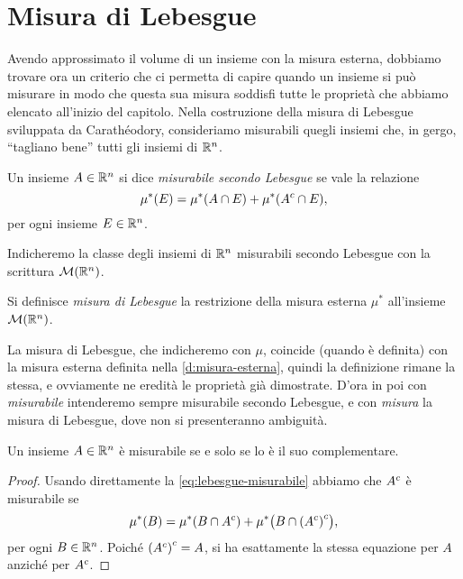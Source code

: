 \section{Misura di Lebesgue}
\label{sec:misura-lebesgue}
Avendo approssimato il volume di un insieme con la misura esterna, dobbiamo trovare ora un criterio che ci permetta di capire quando un insieme si può misurare in modo che questa sua misura soddisfi tutte le proprietà che abbiamo elencato all'inizio del capitolo.
Nella costruzione della misura di Lebesgue sviluppata da Carath\'eodory, consideriamo misurabili quegli insiemi che, in gergo, ``tagliano bene'' tutti gli insiemi di $\mathbb{R}^n$.
\begin{definizione} \label{d:lebesgue-misurabile}
	Un insieme $A\in\mathbb{R}^n$ si dice \emph{misurabile secondo Lebesgue} se vale la relazione
	\begin{equation}
		\mu^*(E)=\mu^*(A\cap E)+\mu^*({A}^c\cap E),
		\label{eq:lebesgue-misurabile}
	\end{equation}
	per ogni insieme $E\in\mathbb{R}^n$.
\end{definizione}
Indicheremo la classe degli insiemi di $\mathbb{R}^n$ misurabili secondo Lebesgue con la scrittura $\mathcal M(\mathbb{R}^n)$.
\begin{definizione} \label{d:misura-lebesgue}
	Si definisce \emph{misura di Lebesgue} la restrizione della misura esterna $\mu^*$ all'insieme $\mathcal M(\mathbb{R}^n)$.
\end{definizione}
La misura di Lebesgue, che indicheremo con $\mu$, coincide (quando è definita) con la misura esterna definita nella \ref{d:misura-esterna}, quindi la definizione rimane la stessa, e ovviamente ne eredità le proprietà già dimostrate.
D'ora in poi con \emph{misurabile} intenderemo sempre misurabile secondo Lebesgue, e con \emph{misura} la misura di Lebesgue, dove non si presenteranno ambiguità.
\begin{proprieta} \label{pr:complementare-misurabile}
	Un insieme $A\in\mathbb{R}^n$ è misurabile se e solo se lo è il suo complementare.
\end{proprieta}
\begin{proof}
	Usando direttamente la \eqref{eq:lebesgue-misurabile} abbiamo che ${A}^c$ è misurabile se
	\begin{equation}
		\mu^*(B)=\mu^*(B\cap{A}^c)+\mu^*\big(B\cap{({A}^c)}^c\big),
	\end{equation}
	per ogni $B\in\mathbb{R}^n$.
Poich\'e ${({A}^c)}^c=A$, si ha esattamente la stessa equazione per $A$ anzich\'e per ${A}^c$.
\end{proof}
